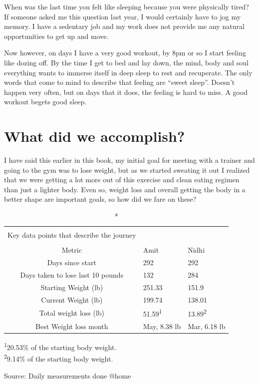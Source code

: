 \documentclass[
  oneside]{book}
\begin{document}
When was the last time you felt like sleeping because you were physically tired? If someone asked me this question last year, I would certainly have to jog my memory. I have a sedentary job and my work does not provide me any natural opportunities to get up and move.

Now however, on days I have a very good workout, by 8pm or so I start feeling like dozing off. By the time I get to bed and lay down, the mind, body and soul everything wants to immerse itself in deep sleep to rest and recuperate. The only words that come to mind to describe that feeling are ``sweet sleep''. Doesn't happen very often, but on days that it does, the feeling is hard to miss. A good workout begets good sleep.

\hypertarget{what-did-we-accomplish}{%
\chapter{What did we accomplish?}\label{what-did-we-accomplish}}

I have said this earlier in this book, my initial goal for meeting with a trainer and going to the gym was to lose weight, but as we started sweating it out I realized that we were getting a lot more out of this exercise and clean eating regimen than just a lighter body. Even so, weight loss and overall getting the body in a better shape are important goals, so how did we fare on these?

\captionsetup[table]{labelformat=empty,skip=1pt}
\begin{longtable}{cll}
\caption*{
\large \textbf{Important Metrics}\\ 
\small Key data points that describe the journey\\ 
} \\ 
\toprule
Metric & Amit & Nidhi \\ 
\midrule
Days since start & 292 & 292 \\ 
Days taken to lose last 10 pounds & 132 & 284 \\ 
Starting Weight (lb) & 251.33 & 151.9 \\ 
Current Weight (lb) & 199.74 & 138.01 \\ 
Total weight loss (lb) & 51.59\textsuperscript{1} & 13.89\textsuperscript{2} \\ 
Best Weight loss month & May, 8.38 lb & Mar, 6.18 lb \\ 
\bottomrule
\end{longtable}
\vspace{-5mm}
\begin{minipage}{\linewidth}
\textsuperscript{1}20.53\% of the starting body weight. \\ 
\textsuperscript{2}9.14\% of the starting body weight. \\ 
\end{minipage}
\begin{minipage}{\linewidth}
Source: Daily measurements done @home\\ 
\end{minipage}
\end{document}

